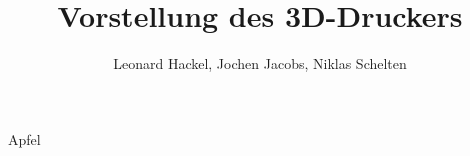 \documentclass[10pt,a4paper]{beamer}
\author{Leonard Hackel, Jochen Jacobs, Niklas Schelten}
\title{Vorstellung des 3D-Druckers}
\begin{document}
Apfel
\end{document}
